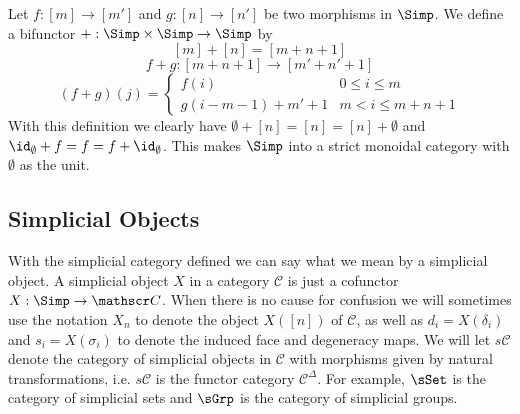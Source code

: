 Let $f : [m] \rightarrow [m']$ and $g : [n] \rightarrow [n']$ be two morphisms in $\Simp$. We define a bifunctor $+ : \Simp \times \Simp \rightarrow \Simp$ by
\[ [m] + [n] = [m + n + 1] \]
\[ f+g : [m+n+1] \rightarrow [m'+n'+1] \]
\[ (f+g)(j) = \begin{cases} f(i) & 0 \leq i \leq m \\  g(i-m-1) + m' + 1 & m < i \leq m+n+1 \end{cases} \]
With this definition we clearly have $\emptyset + [n] = [n] = [n] + \emptyset$ and $\id_{\emptyset} + f = f = f + \id_{\emptyset}$. This makes $\Simp$ into a strict monoidal category with $\emptyset$ as the unit. 




\subsection{Simplicial Objects}


With the simplicial category defined we can say what we mean by a simplicial object. A simplicial object $X$ in a category $\mathscr C$ is just a cofunctor $X : \Simp \rightarrow \mathscr C$. When there is no cause for confusion we will sometimes use the notation $X_n$ to denote the object $X([n])$ of $\mathscr C$, as well as $d_i = X(\delta_i)$ and $s_i = X(\sigma_i)$ to denote the induced face and degeneracy maps. We will let $s\mathscr C$ denote the category of simplicial objects in $\mathscr C$ with morphisms given by natural transformations, i.e. $s\mathscr C$ is the functor category $\mathscr C^{\Delta}$. For example, $\sSet$ is the category of simplicial sets and $\sGrp$ is the category of simplicial groups. 

